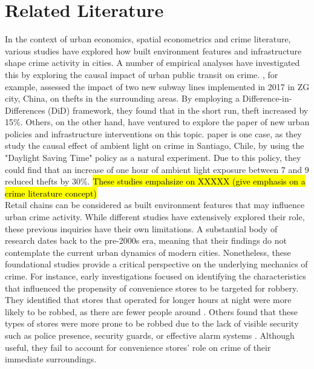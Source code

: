 \documentclass[12pt]{article}
\begin{document}
\section{Related Literature}

In the context of urban economics, spatial econometrics and crime literature, various studies have explored how built environment features and infrastructure shape crime activity in cities. A number of empirical analyses have investigated this by exploring the causal impact of urban public transit on crime. 
\cite{ijgi10100632}, for example, assessed the impact of two new subway lines implemented in 2017 in ZG city, China, on thefts in the surrounding areas. 
By employing a Difference-in-Differences (DiD) framework, they found that in the short run, theft increased by 15\%.
Others, on the other hand, have ventured to explore the paper of new urban policies and infrastructure interventions on this topic. 
\cite{dominguez2022crimetime} paper is one case, as they study the causal effect of ambient light on crime in Santiago, Chile, by using the "Daylight Saving Time" policy as a natural experiment. Due to this policy, they could find that an increase of one hour of ambient light exposure between 7 and 9 reduced thefts by 30\%. 
\hl{These studies empahsize on XXXXX (give emphasis on a crime literature concept)}\\ 

Retail chains can be considered as built environment features that may influence urban crime activity. 
While different studies have extensively explored their role, these previous inquiries have their own limitations. 
A substantial body of research dates back to the pre-2000s era, meaning that their findings do not contemplate the current urban dynamics of modern cities.
Nonetheless, these foundational studies provide a critical perspective on the underlying mechanics of crime. For instance, early investigations focused on identifying the characteristics that influenced the propensity of convenience stores to be targeted for robbery. 
They identified that stores that operated for longer hours at night were more likely to be robbed, as there are fewer people around \parencite{dalessio1990crime}. 
Others found that these types of stores were more prone to be robbed due to the lack of visible security such as police presence, security guards, or effective alarm systems \parencite{Wellford1997, Dugato2026}. 
Although useful, they fail to account for convenience stores’ role on crime of their immediate surroundings.\\
\end{document}
